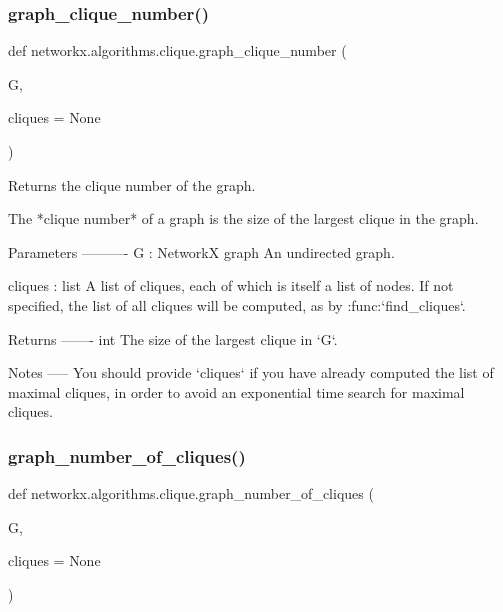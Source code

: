 \subsubsection{\texorpdfstring{graph\+\_\+clique\+\_\+number()}{graph\_clique\_number()}}
{\footnotesize\ttfamily def networkx.\+algorithms.\+clique.\+graph\+\_\+clique\+\_\+number (\begin{DoxyParamCaption}\item[{}]{G,  }\item[{}]{cliques = {\ttfamily None} }\end{DoxyParamCaption})}

\begin{DoxyVerb}Returns the clique number of the graph.

The *clique number* of a graph is the size of the largest clique in
the graph.

Parameters
----------
G : NetworkX graph
    An undirected graph.

cliques : list
    A list of cliques, each of which is itself a list of nodes. If
    not specified, the list of all cliques will be computed, as by
    :func:`find_cliques`.

Returns
-------
int
    The size of the largest clique in `G`.

Notes
-----
You should provide `cliques` if you have already computed the list
of maximal cliques, in order to avoid an exponential time search for
maximal cliques.\end{DoxyVerb}
 \mbox{\label{namespacenetworkx_1_1algorithms_1_1clique_a9e77cc301d15b809def1d0f35945a380}} 
\subsubsection{\texorpdfstring{graph\+\_\+number\+\_\+of\+\_\+cliques()}{graph\_number\_of\_cliques()}}
{\footnotesize\ttfamily def networkx.\+algorithms.\+clique.\+graph\+\_\+number\+\_\+of\+\_\+cliques (\begin{DoxyParamCaption}\item[{}]{G,  }\item[{}]{cliques = {\ttfamily None} }\end{DoxyParamCaption})}

